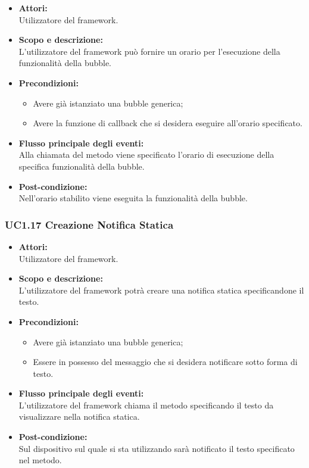 \begin{itemize}
	\item \textbf{Attori:}
	\\Utilizzatore del framework.
	\item \textbf{Scopo e descrizione:} 
	\\L’utilizzatore del framework può fornire un orario per l’esecuzione della funzionalità della bubble.
	\item \textbf{Precondizioni:}
	\begin{itemize}
		\item Avere già istanziato una bubble generica;
		\item Avere la funzione di callback che si desidera eseguire all’orario specificato.
	\end{itemize}
	\item \textbf{Flusso principale degli eventi:}
	\\Alla chiamata del metodo viene specificato l’orario di esecuzione della specifica funzionalità della bubble.
	\item \textbf{Post-condizione:}
	\\Nell’orario stabilito viene eseguita la funzionalità della bubble.
\end{itemize}

\subsubsection{UC1.17 Creazione Notifica Statica} \label{UC1.17}

\begin{itemize}
	\item \textbf{Attori:}
	\\Utilizzatore del framework.
	\item \textbf{Scopo e descrizione:} 
	\\L’utilizzatore del framework potrà creare una notifica statica specificandone il testo.
	\item \textbf{Precondizioni:}
	\begin{itemize}
		\item Avere già istanziato una bubble generica;
		\item Essere in possesso del messaggio che si desidera notificare sotto forma di testo.
	\end{itemize}
	\item \textbf{Flusso principale degli eventi:}
	\\L’utilizzatore del framework chiama il metodo specificando il testo da visualizzare nella notifica statica.
	\item \textbf{Post-condizione:}
	\\Sul dispositivo sul quale si sta utilizzando  sarà notificato il testo specificato nel metodo.
\end{itemize}

